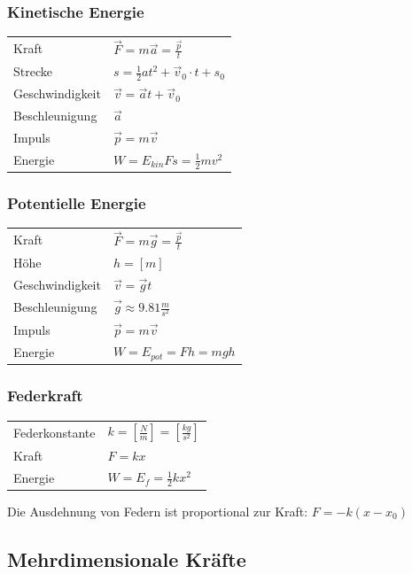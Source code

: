 \documentclass[a4paper]{scrartcl}
\begin{document}
\subsubsection{Kinetische Energie}
	\begin{tabu} {l X}
		Kraft & $\vec{F} = m\vec{a} = \frac{\vec{p}}{t}$ \\
		Strecke & $s = \frac{1}{2} a t^2 + \vec{v}_0 \cdot t + s_0$ \\
		Geschwindigkeit & $\vec{v} = \vec{a}t + \vec{v}_0$ \\
		Beschleunigung & $\vec{a}$\\
		Impuls & $\vec{p} = m\vec{v}$ \\
		Energie & $W = E_{kin} Fs = \frac{1}{2} mv^2$
	\end{tabu}

\subsubsection{Potentielle Energie}
	
	\begin{tabu} {l X}
		Kraft & $\vec{F} = m\vec{g} = \frac{\vec{p}}{t}$ \\
		Höhe & $h = \left[ m \right]$ \\
		Geschwindigkeit & $\vec{v} = \vec{g}t$ \\
		Beschleunigung & $\vec{g} \approx 9.81 \frac{m}{s^2}$ \\
		Impuls & $\vec{p} = m\vec{v}$ \\
		Energie & $W = E_{pot} = Fh = mgh$
	\end{tabu}

\subsubsection{Federkraft}
	
	\begin{tabu} {l X}
		Federkonstante & $k = \left[ \frac{N}{m} \right] = \left[ \frac{kg}{s^2} \right]$ \\
		Kraft & $F = kx$ \\ %
		Energie & $	W = E_f = \frac{1}{2} k x^2$
	\end{tabu}

	Die Ausdehnung von Federn ist proportional zur Kraft: $F = -k(x -x_0)$ %

\subsection{Mehrdimensionale Kräfte}
\end{document}
